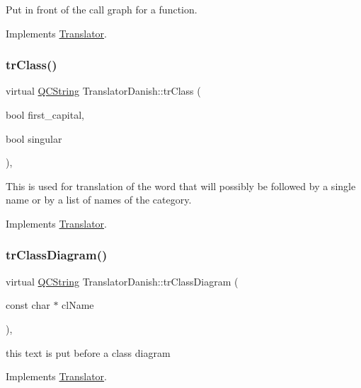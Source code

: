 Put in front of the call graph for a function. 

Implements \mbox{\hyperlink{class_translator}{Translator}}.

\mbox{\label{class_translator_danish_ac4e20f06350563a06c182724b19782b6}} 
\subsubsection{\texorpdfstring{trClass()}{trClass()}}
{\footnotesize\ttfamily virtual \mbox{\hyperlink{class_q_c_string}{Q\+C\+String}} Translator\+Danish\+::tr\+Class (\begin{DoxyParamCaption}\item[{bool}]{first\+\_\+capital,  }\item[{bool}]{singular }\end{DoxyParamCaption})\hspace{0.3cm}{\ttfamily [inline]}, {\ttfamily [virtual]}}

This is used for translation of the word that will possibly be followed by a single name or by a list of names of the category. 

Implements \mbox{\hyperlink{class_translator}{Translator}}.

\mbox{\label{class_translator_danish_a12f703b4f627d232fe88506886b4c832}} 
\subsubsection{\texorpdfstring{trClassDiagram()}{trClassDiagram()}}
{\footnotesize\ttfamily virtual \mbox{\hyperlink{class_q_c_string}{Q\+C\+String}} Translator\+Danish\+::tr\+Class\+Diagram (\begin{DoxyParamCaption}\item[{const char $\ast$}]{cl\+Name }\end{DoxyParamCaption})\hspace{0.3cm}{\ttfamily [inline]}, {\ttfamily [virtual]}}

this text is put before a class diagram 

Implements \mbox{\hyperlink{class_translator}{Translator}}.

